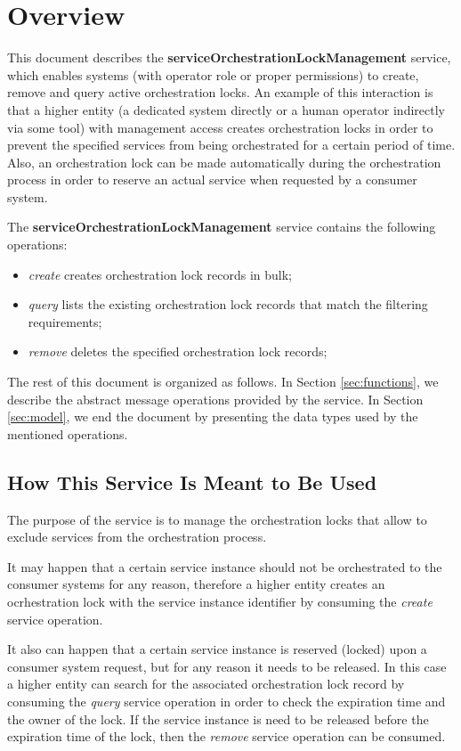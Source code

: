 \documentclass[a4paper]{arrowhead}
\begin{document}
\section{Overview}
\label{sec:overview}
This document describes the \textbf{serviceOrchestrationLockManagement} service, which enables systems (with operator role or proper permissions) to create, remove and query active orchestration locks. An example of this interaction is that a higher entity (a dedicated system directly or a human operator indirectly via some tool) with management access creates orchestration locks in order to prevent the specified services from being orchestrated for a certain period of time. Also, an orchestration lock can be made automatically during the orchestration process in order to reserve an actual service when requested by a consumer system.

The \textbf{serviceOrchestrationLockManagement} service contains the following operations:

\begin{itemize}
    \item \textit{create} creates orchestration lock records in bulk;
    \item \textit{query} lists the existing orchestration lock records that match the filtering requirements;
    \item \textit{remove} deletes the specified orchestration lock records;
\end{itemize}

The rest of this document is organized as follows.
In Section \ref{sec:functions}, we describe the abstract message operations provided by the service.
In Section \ref{sec:model}, we end the document by presenting the data types used by the mentioned operations.

\subsection{How This Service Is Meant to Be Used}

The purpose of the service is to manage the orchestration locks that allow to exclude services from the orchestration process.

It may happen that a certain service instance should not be orchestrated to the consumer systems for any reason, therefore a higher entity creates an ocrhestration lock with the service instance identifier by consuming the \textit{create} service operation.

It also can happen that a certain service instance is reserved (locked) upon a consumer system request, but for any reason it needs to be released. In this case a higher entity can search for the associated orchestration lock record by consuming the \textit{query} service operation in order to check the expiration time and the owner of the lock. If the service instance is need to be released before the expiration time of the lock, then the \textit{remove} service operation can be consumed.
\end{document}
